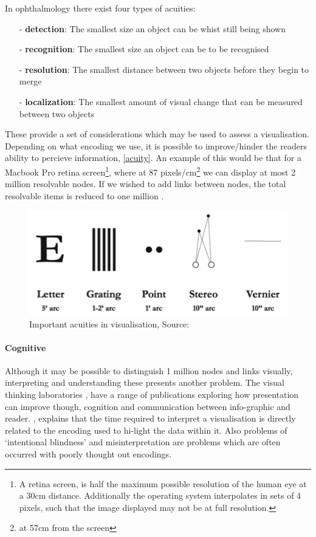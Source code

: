  In ophthalmology there exist four types of  acuities: 
\begin{itemize}
\item[-] \textbf{detection}: The smallest size an object can be whist still being shown
\item[-] \textbf{recognition}: The smallest size an object can be to be recognised
\item[-] \textbf{resolution}: The smallest distance between two objects before they begin to merge
\item[-] \textbf{localization}: The smallest amount of visual change that can be measured between two objects
\end{itemize}

These provide a set of considerations which may be used to assess a visualisation. Depending on what encoding we use, it is possible to improve/hinder the readers ability to percieve information, \autoref{acuity}. An example of this would be that for a Macbook Pro retina screen\footnote{A retina screen, is half the maximum possible resolution of the human eye at a 30cm distance. Additionally the operating system interpolates in sets of 4 pixels, such that the image displayed may not be at full resolution.}, where at 87 pixels/cm\footnote{at 57cm from the screen} we can display at most 2 million resolvable nodes. If we wished to add links between nodes, the total resolvable items is reduced to one million
\citep{ch10}. 

\begin{figure}[H]
\begin{center}
\includegraphics[scale=.6]{figures_c1/acuity.png}
\end{center}
\caption{Important acuities in visualisation, Source: \citep{ch10,ware}}\label{acuity}
\end{figure}


\paragraph{Cognitive}
Although it may be possible to distinguish 1 million nodes and links visually, interpreting and understanding these presents another problem. The visual thinking laboratories \citep{vt}, have a range of publications exploring how presentation can improve though, cognition and communication between info-graphic and reader. \citep{OpenVis}, explains that the time required to interpret a visualisation is directly related to the encoding used to hi-light the data within it. Also problems of `intentional blindness' and misinterpretation are problems which are often occurred with poorly thought out encodings.  

